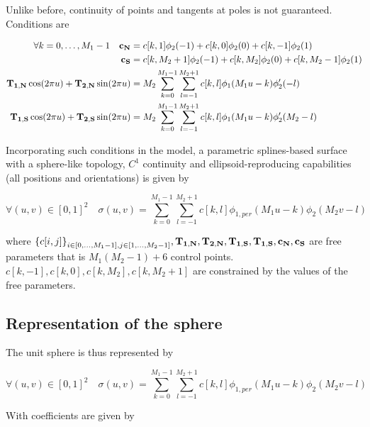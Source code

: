 \documentclass[a4paper, 11pt]{article}
\begin{document}
Unlike before, continuity of points and tangents at poles is not guaranteed. Conditions are

\begin{align}
  \forall k=0, \ldots, M_1-1 \quad {\bf c_N} &= c[k,1] \phi_2(-1) + c[k,0]\phi_2(0) + c[k,-1] \phi_2(1) \\
  {\bf c_S} &= c[k,M_2+1] \phi_2(-1) + c[k,M_2]\phi_2(0) + c[k,M_2-1] \phi_2(1) \\ 
  {\bf T_{1,N}}\cos (2\pi u) + {\bf T_{2,N}}\sin (2\pi u) &=  M_2 \sum_{k=0}^{M_1-1} \sum_{l=-1}^{M_2+1} c[k,l] \phi_{1} 
  (M_1u-k)\phi_2'(-l) \\
  {\bf T_{1,S}}\cos (2\pi u) + {\bf T_{2,S}}\sin (2\pi u) &=  M_2 \sum_{k=0}^{M_1-1} \sum_{l=-1}^{M_2+1} c[k,l] \phi_{1} 
  (M_1u-k)\phi_2'(M_2-l) \\
\end{align}


Incorporating such conditions in the model, a parametric splines-based surface with a sphere-like topology, $C^1$ 
continuity and ellipsoid-reproducing capabilities (all positions and orientations) is given by

\begin{equation}
    \forall (u, v) \in {[0,1]}^2 \quad \sigma(u,v) = \sum_{k=0}^{M_1-1} \sum_{l=-1}^{M_2+1} c[k,l] \phi_{1, per} 
    (M_1u-k)\phi_2(M_2v-l)
\end{equation}
  
where ${\{c[i,j]\}}_{i \in [0, \ldots, M_1-1], j \in [1, \ldots, M_2-1]}, {\bf T_{1, N}}, {\bf T_{2, N}}, {\bf T_{1, S}} 
, {\bf T_{1, S}}, {\bf c_{N}}, {\bf c_{S}}$ are free parameters that is $M_1(M_2-1) + 6$ control points. \\

$c[k,-1], c[k, 0], c[k, M_2], c[k, M_2+1]$ are constrained by the values of the free parameters. \\

\subsection{Representation of the sphere}

The unit sphere is thus represented by

\begin{equation}
    \boxed{\forall (u, v) \in {[0,1]}^2 \quad \sigma(u,v) = \sum_{k=0}^{M_1-1} \sum_{l=-1}^{M_2+1} c[k,l] \phi_{1, per} 
    (M_1u-k)\phi_2(M_2v-l)}
\end{equation}


With coefficients are given by
\end{document}
